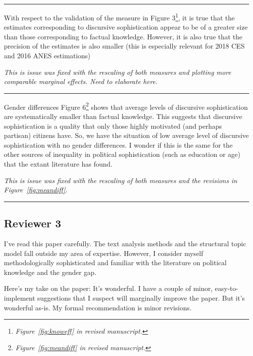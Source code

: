 
\rule{\linewidth}{.01cm}

With respect to the validation of the measure in Figure 3\footnote{\textit{Figure~\ref{fig:knoweff} in revised manuscript.}}, it is true that the estimates corresponding to discursive sophistication appear to be of a greater size than those corresponding to factual knowledge. However, it is also true that the precision of the estimates is also smaller (this is especially relevant for 2018 CES and 2016 ANES estimations)

\textit{This is issue was fixed with the rescaling of both measures and plotting more comparable marginal effects. Need to elaborate here.}


\rule{\linewidth}{.01cm}

Gender differences Figure 6\footnote{\textit{Figure~\ref{fig:meandiff} in revised manuscript.}} shows that average levels of discursive sophistication are systematically smaller than factual knowledge. This suggests that discursive sophistication is a quality that only those highly motivated (and perhaps partisan) citizens have. So, we have the situation of low average level of discursive sophistication with no gender differences. I wonder if this is the same for the other sources of inequality in political sophistication (such as education or age) that the extant literature has found.

\textit{This is issue was fixed with the rescaling of both measures and the revisions in Figure~\ref{fig:meandiff}.}


\rule{\linewidth}{.01cm}


\subsection*{Reviewer 3}

I’ve read this paper carefully. The text analysis methods and the structural topic model fall outside my area of expertise. However, I consider myself methodologically sophisticated and familiar with the literature on political knowledge and the gender gap.

Here’s my take on the paper: It’s wonderful. I have a couple of minor, easy-to-implement suggestions that I suspect will marginally improve the paper. But it’s wonderful as-is. My formal recommendation is minor revisions.

